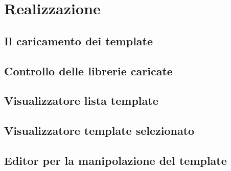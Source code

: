 
\chapter{Realizzazione}
\label{cap:realizzazione}

\section{Il caricamento dei template}

\section{Controllo delle librerie caricate}

\section{Visualizzatore lista template}

\section{Visualizzatore template selezionato}

\section{Editor per la manipolazione del template}

